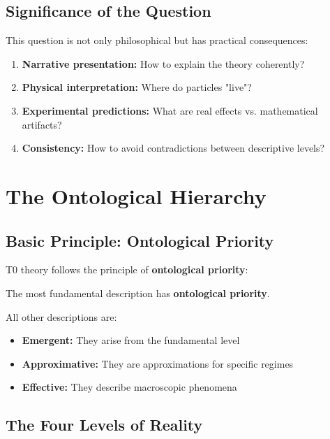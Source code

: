 	\subsection{Significance of the Question}
	
	This question is not only philosophical but has practical consequences:
	
	\begin{enumerate}
		\item \textbf{Narrative presentation:} How to explain the theory coherently?
		\item \textbf{Physical interpretation:} Where do particles "live"?
		\item \textbf{Experimental predictions:} What are real effects vs. mathematical artifacts?
		\item \textbf{Consistency:} How to avoid contradictions between descriptive levels?
	\end{enumerate}
	
	\section{The Ontological Hierarchy}
	
	\subsection{Basic Principle: Ontological Priority}
	
	T0 theory follows the principle of \textbf{ontological priority}:
	
	\begin{keyresult}
		The most fundamental description has \textbf{ontological priority}.
		
		All other descriptions are:
		\begin{itemize}
			\item \textbf{Emergent:} They arise from the fundamental level
			\item \textbf{Approximative:} They are approximations for specific regimes
			\item \textbf{Effective:} They describe macroscopic phenomena
		\end{itemize}
	\end{keyresult}
	
	\subsection{The Four Levels of Reality}
	

